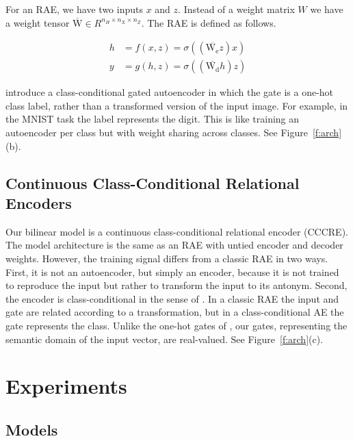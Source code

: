 \documentclass[11pt]{article}
\begin{document}
For an RAE, we have two inputs $x$ and $z$. Instead of a weight matrix $W$ we have a weight tensor $\overline{\mathrm{W}} \in R^{n_H \times n_X \times n_Z}$.  The RAE is defined as follows.

\vspace{-5mm}
\begin{equation}
\begin{split}
h & = f(x, z) = \sigma ((\overline{\mathrm{W_e}}z)x) \\
y & = g(h, z) = \sigma ((\overline{\mathrm{W_d}}h)z)
\end{split}
\end{equation}
\vspace{-3mm}

\citet{rudy:15} introduce a class-conditional gated autoencoder in which the gate is a one-hot class label, rather than a transformed version of the input image. For example, in the MNIST task the label represents the digit. This is like training an autoencoder per class but with weight sharing across classes. See Figure~\ref{f:arch}(b).

\subsection{Continuous Class-Conditional Relational Encoders}

Our bilinear model is a continuous class-conditional relational encoder (CCCRE). The model architecture is the same as an RAE with untied encoder and decoder weights. However, the training signal differs from a classic RAE in two ways. First, it is not an autoencoder, but simply an encoder, because it is not trained to reproduce the input but rather to transform the input to its antonym. Second, the encoder is class-conditional in the sense of \cite{rudy:15}. In a classic RAE the input and gate are related according to a transformation, but in a class-conditional AE the gate represents the class. Unlike the one-hot gates of \cite{rudy:15}, our gates, representing the semantic domain of the input vector, are real-valued. See Figure~\ref{f:arch}(c).

\section{Experiments}

\subsection{Models}
\end{document}
